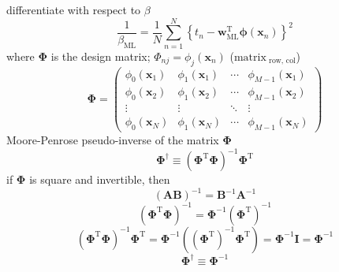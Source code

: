 \documentclass{article}
\begin{document}
	differentiate with respect to $\beta$
	$$
	\frac{1}{\beta_{\mathrm{ML}}}=\frac{1}{N} \sum_{n=1}^{N}\left\{t_{n}-\mathbf{w}_{\mathrm{ML}}^{\mathrm{T}} \boldsymbol{\phi}\left(\mathbf{x}_{n}\right)\right\}^{2}
	$$
	where $\boldsymbol{\Phi}$ is the design matrix; $
	\Phi_{n j}=\phi_{j}\left(\mathbf{x}_{n}\right)$ ($\text{matrix}_{\text{ row, col}}$)
	$$
	\boldsymbol{\Phi}=\left(\begin{array}{cccc}
	\phi_{0}\left(\mathbf{x}_{1}\right) & \phi_{1}\left(\mathbf{x}_{1}\right) & \cdots & \phi_{M-1}\left(\mathbf{x}_{1}\right) \\
	\phi_{0}\left(\mathbf{x}_{2}\right) & \phi_{1}\left(\mathbf{x}_{2}\right) & \cdots & \phi_{M-1}\left(\mathbf{x}_{2}\right) \\
	\vdots & \vdots & \ddots & \vdots \\
	\phi_{0}\left(\mathbf{x}_{N}\right) & \phi_{1}\left(\mathbf{x}_{N}\right) & \cdots & \phi_{M-1}\left(\mathbf{x}_{N}\right)
	\end{array}\right)
	$$
	Moore-Penrose pseudo-inverse of the matrix $\boldsymbol{\Phi}$
	$$
	\boldsymbol{\Phi}^{\dagger} \equiv\left(\boldsymbol{\Phi}^{\mathrm{T}} \boldsymbol{\Phi}\right)^{-1} \boldsymbol{\Phi}^{\mathrm{T}}
	$$
	if $\boldsymbol{\Phi}$ is square and invertible, then
	$$
	(\mathbf{A B})^{-1}=\mathbf{B}^{-1} \mathbf{A}^{-1}
	$$	
	$$(\boldsymbol{\Phi}^{\mathrm{T}} \boldsymbol{\Phi})^{-1}=\boldsymbol{\Phi}^{-1} (\boldsymbol{\Phi}^{\mathrm{T}})^{-1}
	$$
	$$(\boldsymbol{\Phi}^{\mathrm{T}} \boldsymbol{\Phi})^{-1}
	\boldsymbol{\Phi}^{\mathrm{T}}=\boldsymbol{\Phi}^{-1}((\boldsymbol{\Phi}^{\mathrm{T}})^{-1}\boldsymbol{\Phi}^{\mathrm{T}})=\boldsymbol{\Phi}^{-1}\mathbf{I}=\boldsymbol{\Phi}^{-1}
	$$
	$$
	\boldsymbol{\Phi}^{\dagger} \equiv \boldsymbol{\Phi}^{-1}
	$$
	
	\pagebreak
\end{document}

